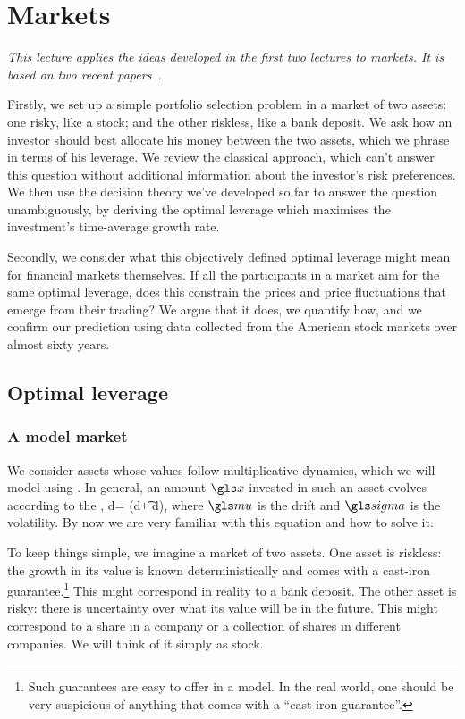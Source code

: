 \newpage

\section{Markets}

{\it This lecture applies the ideas developed in the first two lectures to markets. It is based on two recent papers~\cite{Peters2011a,PetersAdamou2013}.

Firstly, we set up a simple portfolio selection problem in a market of two assets: one risky, like a stock; and the other riskless, like a bank deposit. We ask how an investor should best allocate his money between the two assets, which we phrase in terms of his leverage. We review the classical approach, which can't answer this question without additional information about the investor's risk preferences. We then use the decision theory we've developed so far to answer the question unambiguously, by deriving the optimal leverage which maximises the investment's time-average growth rate.

Secondly, we consider what this objectively defined optimal leverage might mean for financial markets themselves. If all the participants in a market aim for the same optimal leverage, does this constrain the prices and price fluctuations that emerge from their trading? We argue that it does, we quantify how, and we confirm our prediction using data collected from the American stock markets over almost sixty years.
}
\newpage


\subsection{Optimal leverage}

\subsubsection{A model market}
We consider assets whose values follow multiplicative dynamics, which we will model using \GBM. In general, an amount $\x$ invested in such an asset evolves according to the \SDE,
\be
d\x = \x(\gmu d\t + \gsigma d\gW),
\ee
where $\gmu$ is the drift and $\gsigma$ is the volatility. By now we are very familiar with this equation and how to solve it.

To keep things simple, we imagine a market of two assets. One asset is riskless: the growth in its value is known deterministically and comes with a cast-iron guarantee.\footnote{Such guarantees are easy to offer in a model. In the real world, one should be very suspicious of anything that comes with a ``cast-iron guarantee''.} This might correspond in reality to a bank deposit. The other asset is risky: there is uncertainty over what its value will be in the future. This might correspond to a share in a company or a collection of shares in different companies. We will think of it simply as stock.

